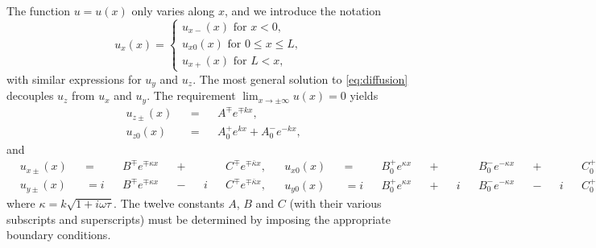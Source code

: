 The function $u = u(x)$ only varies along $x$,
and we introduce the notation
\begin{equation}
  u_x (x) =
    \begin{cases}
      u_{x-} (x) \text{ for } x < 0    , \\
      u_{x0} (x) \text{ for } 0 ≤ x ≤ L, \\
      u_{x+} (x) \text{ for }     L < x,
    \end{cases}
\end{equation}
with similar expressions for $u_y$ and $u_z$.
The most general solution to \cref{eq:diffusion}
decouples $u_z$ from $u_x$ and $u_y$.
The requirement $\lim_{x → ± ∞} u(x) = 0$ yields
\begin{subequations}
  \begin{alignat}{3}
    & u_{z±} (x) && {}={} && A^∓ e^{∓ k x}, \\
    & u_{z0} (x) && {}={} && A_0^+ e^{k x} {}+{} A_0^- e^{-k x},
  \end{alignat}
\end{subequations}
and
\begin{subequations}
  \begin{alignat}{6}
    & u_{x±} (x) && =   && B^∓ e^{∓ κ x} && {}+{} &&   && C^∓ e^{∓ \bar{κ} x}, \\
    & u_{y±} (x) && = i && B^∓ e^{∓ κ x} && {}-{} && i && C^∓ e^{∓ \bar{κ} x},
  \end{alignat}
  \begin{alignat}{12}
    & u_{x0} (x) && =   && B_0^+ e^{κ x} && {}+{} &&   && B_0^- e^{- κ x} && {}+{} &&   && C_0^+ e^{ \bar{κ} x } && {}+{} &&   && C_0^- e^{ - \bar{κ} x }, \\
    & u_{y0} (x) && = i && B_0^+ e^{κ x} && {}+{} && i && B_0^- e^{- κ x} && {}-{} && i && C_0^+ e^{ \bar{κ} x } && {}-{} && i && C_0^- e^{ - \bar{κ} x },
  \end{alignat}
\end{subequations}
where $κ = k \sqrt{1 + i ω τ}$.
The twelve constants $A$, $B$ and $C$
(with their various subscripts and superscripts)
must be determined by imposing the appropriate boundary conditions.

